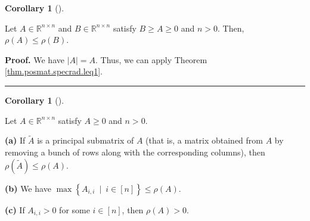 \documentclass[numbers=enddot,12pt,final,onecolumn,notitlepage]{scrartcl}%
\numberwithin{exer}{subsection}
\theoremstyle{definition}
\newtheorem{coro}[theo]{Corollary}
\newenvironment{corollary}[1][]
{\begin{coro}[#1]\begin{leftbar}}
{\end{leftbar}\end{coro}}
\newenvironment{proof}[1][Proof]{\noindent\textbf{#1.} }{\ \rule{0.5em}{0.5em}}
\begin{document}
\begin{corollary}
\label{cor.posmat.specrad.leq1b}Let $A\in\mathbb{R}^{n\times n}$ and
$B\in\mathbb{R}^{n\times n}$ satisfy $B\geq A\geq0$ and $n>0$. Then,
$\rho\left(  A\right)  \leq\rho\left(  B\right)  $.
\end{corollary}

\begin{proof}
We have $\left\vert A\right\vert =A$. Thus, we can apply Theorem
\ref{thm.posmat.specrad.leq1}.
\end{proof}

\begin{corollary}
\label{cor.posmat.specrad.leq1c}Let $A\in\mathbb{R}^{n\times n}$ satisfy
$A\geq0$ and $n>0$. \medskip

\textbf{(a)} If $\widetilde{A}$ is a principal submatrix of $A$ (that is, a
matrix obtained from $A$ by removing a bunch of rows along with the
corresponding columns), then $\rho\left(  \widetilde{A}\right)  \leq
\rho\left(  A\right)  $. \medskip

\textbf{(b)} We have $\max\left\{  A_{i,i}\ \mid\ i\in\left[  n\right]
\right\}  \leq\rho\left(  A\right)  $. \medskip

\textbf{(c)} If $A_{i,i}>0$ for some $i\in\left[  n\right]  $, then
$\rho\left(  A\right)  >0$.
\end{corollary}
\end{document}
